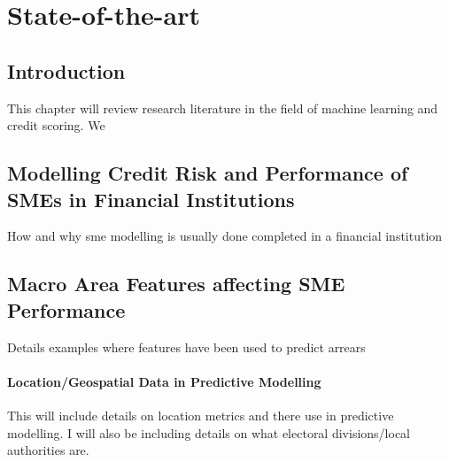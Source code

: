 
\chapter{State-of-the-art} %

\label{Chapter2} %


\section{Introduction}
This chapter will review research literature in the field of machine learning and credit scoring. We 



\section{Modelling Credit Risk and Performance of SMEs in Financial Institutions}
How and why sme modelling is usually done completed in a financial institution



\section{Macro Area Features affecting SME Performance}
Details examples where features have been used to predict arrears


\subsubsection{Location/Geospatial Data in Predictive Modelling}
This will include details on location metrics and there use in predictive modelling. I will also be including details on what electoral divisions/local authorities are.

